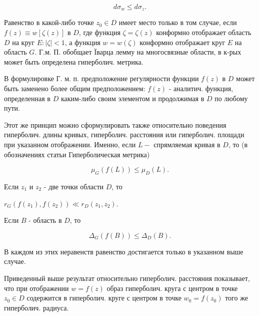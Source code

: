 \documentclass[10pt]{article}
\begin{document}
\[

d \sigma_{w} \leqslant d \sigma_{z} .

\]



Равенство в какой-либо точке $z_{0} \in D$ имеет место только в том случае, если $f(z) \equiv w[\zeta(z)]$ в $D$, где функция $\zeta=\zeta(z)$ конформно отображает область $D$ на круг $E:|\zeta|<1$, а функция $w=w(\zeta)$ конформно отображает круг $E$ на область $G$. Г.м. П. обобщает Ïварца лемму на многосвязные области, в к-рых может быть определена гиперболич. метрика.



В формулировке Г. м. п. предположение регулярности функции $f(z)$ в $D$ может быть заменено более общим предположением: $f(z)$ - аналитич. функция, определенная в $D$ каким-либо своим элементом и продолжимая в $D$ по любому пути.



Этот же принцип можно сформулировать также относительно поведения гиперболич. длины кривых, гиперболич. расстояния или гиперболич. площади при указанном отображении. Именно, если $L-$ спрямляемая кривая в $D$, то (в обозначениях статьи Гиперболическая метрика)



\[

\mu_{G}(f(L)) \leqslant \mu_{D}(L) .

\]



Если $z_{1}$ и $z_{2}$ - две точки области $D$, то



$r_{G}\left(f\left(z_{1}\right), f\left(z_{2}\right)\right) \ll r_{D}\left(z_{1}, z_{2}\right)$.



Если $B$ - область в $D$, то



\[

\Delta_{G}(f(B)) \leqslant \Delta_{D}(B) .

\]



В каждом из этих неравенств равенство достигается только в указанном выше случае.



Приведенный выше результат относительно гиперболич. расстояния показывает, что при отображении $w=f(z)$ образ гиперболич. круга с центром в точке $z_{0} \in D$ содержится в гиперболич. круге с центром в точке $w_{0}=f\left(z_{0}\right)$ того же гиперболич. радиуса.
\end{document}
